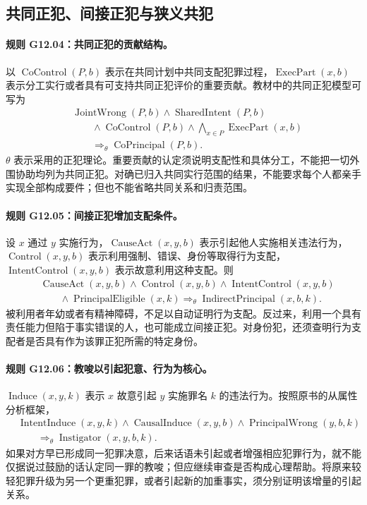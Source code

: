 \subsection{共同正犯、间接正犯与狭义共犯}
\paragraph{规则 G12.04：共同正犯的贡献结构。}
以 $\operatorname{CoControl}(P,b)$ 表示在共同计划中共同支配犯罪过程，$\operatorname{ExecPart}(x,b)$ 表示分工实行或者具有可支持共同正犯评价的重要贡献。教材中的共同正犯模型可写为
\[
\begin{aligned}
&\operatorname{JointWrong}(P,b)\land\operatorname{SharedIntent}(P,b)\\
&\qquad\land\operatorname{CoControl}(P,b)\land\bigwedge_{x\in P}\operatorname{ExecPart}(x,b)\\
&\qquad\Longrightarrow_{\theta}\operatorname{CoPrincipal}(P,b).
\end{aligned}
\]
$\theta$ 表示采用的正犯理论。重要贡献的认定须说明支配性和具体分工，不能把一切外围协助均列为共同正犯。对确已归入共同实行范围的结果，不能要求每个人都亲手实现全部构成要件；但也不能省略共同关系和归责范围。

\paragraph{规则 G12.05：间接正犯增加支配条件。}
设 $x$ 通过 $y$ 实施行为，$\operatorname{CauseAct}(x,y,b)$ 表示引起他人实施相关违法行为，$\operatorname{Control}(x,y,b)$ 表示利用强制、错误、身份等取得行为支配，$\operatorname{IntentControl}(x,y,b)$ 表示故意利用这种支配。则
\[
\begin{aligned}
&\operatorname{CauseAct}(x,y,b)\land\operatorname{Control}(x,y,b)
\land\operatorname{IntentControl}(x,y,b)\\
&\qquad\land\operatorname{PrincipalEligible}(x,k)
\Longrightarrow_{\theta}\operatorname{IndirectPrincipal}(x,b,k).
\end{aligned}
\]
被利用者年幼或者有精神障碍，不足以自动证明行为支配。反过来，利用一个具有责任能力但陷于事实错误的人，也可能成立间接正犯。对身份犯，还须查明行为支配者是否具有作为该罪正犯所需的特定身份。

\paragraph{规则 G12.06：教唆以引起犯意、行为为核心。}
$\operatorname{Induce}(x,y,k)$ 表示 $x$ 故意引起 $y$ 实施罪名 $k$ 的违法行为。按照原书的从属性分析框架，
\[
\begin{aligned}
&\operatorname{IntentInduce}(x,y,k)
\land\operatorname{CausalInduce}(x,y,b)
\land\operatorname{PrincipalWrong}(y,b,k)\\
&\qquad\Longrightarrow_{\theta}\operatorname{Instigator}(x,y,b,k).
\end{aligned}
\]
如果对方早已形成同一犯罪决意，后来话语未引起或者增强相应犯罪行为，就不能仅据说过鼓励的话认定同一罪的教唆；但应继续审查是否构成心理帮助。将原来较轻犯罪升级为另一个更重犯罪，或者引起新的加重事实，须分别证明该增量的引起关系。

